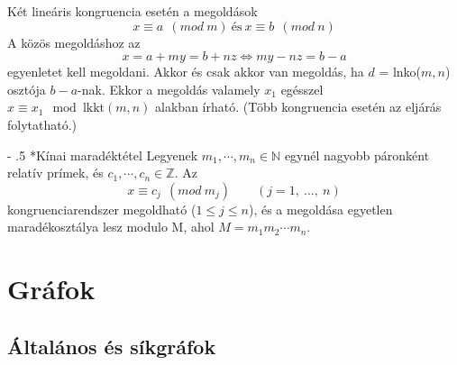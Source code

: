 \documentclass[12pt,margin=0px]{article}
\makeatletter
\newcommand{\N}{\mathbb{N}}
\newcommand{\Z}{\mathbb{Z}}
\renewcommand\paragraph{%
	\@startsection{paragraph}{4}{0mm}%
	{-\baselineskip}%
	{.5\baselineskip}%
	{\normalfont\normalsize\bfseries}}
\makeatother
\begin{document}
	Két lineáris kongruencia esetén a megoldások
    \[
        x \equiv a\ \ (mod\ m)\ \text{és}\ x \equiv b\ \ (mod\ n)
    \]
    A közös megoldáshoz az
    \[x = a + my = b+ nz \Leftrightarrow my-nz = b-a\]
    egyenletet kell megoldani. Akkor és csak akkor van megoldás, ha $d$ = lnko($m,n$) osztója $b-a$-nak. Ekkor a megoldás valamely $x_1$ egésszel ${ x \equiv x_1 \mod{\textrm{lkkt}(m,n)}}$ alakban írható. (Több kongruencia esetén az eljárás folytatható.)

	\paragraph*{Kínai maradéktétel}
	Legyenek $m_1,\cdots,m_n \in\N$ egynél nagyobb páronként relatív prímek, és $c_1,\cdots,c_n \in\Z$. Az
    \[
        x \equiv c_j\ \ (mod\ m_j) \qquad (j=1,\ \ldots,\ n)
    \]
    kongruenciarendszer megoldható ($1 \leq j \leq n$), és a megoldása egyetlen maradékosztálya lesz modulo M, ahol $M = m_1m_2\cdots m_n$.

\section*{Gráfok}
	
\subsection*{Általános és síkgráfok}
			
\end{document}
